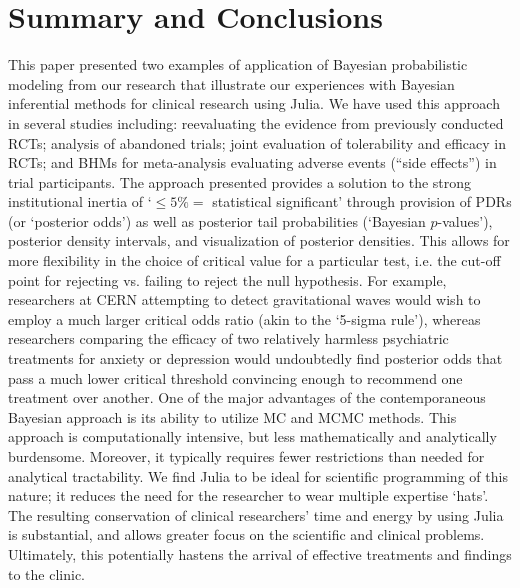 \documentclass{juliacon}
\begin{document}
\section{Summary and Conclusions}
This paper presented two examples of application of Bayesian probabilistic modeling from our research that illustrate our experiences with Bayesian inferential methods for clinical research using Julia.  We have used this approach in several studies including: reevaluating the evidence from previously conducted RCTs; analysis of abandoned trials; joint evaluation of tolerability and efficacy in RCTs; and BHMs for meta-analysis evaluating adverse events (“side effects”) in trial participants.
\vskip 6pt
The approach presented provides a solution to the strong institutional inertia of `$\le 5\% =$ statistical significant’ through provision of PDRs (or `posterior odds') as well as posterior tail probabilities (`Bayesian $p$-values’), posterior density intervals, and visualization of posterior densities. This allows for more flexibility in the choice of critical value for a particular test, i.e. the cut-off point for rejecting vs. failing to reject the null hypothesis.  For example, researchers at CERN attempting to detect gravitational waves would wish to employ a much larger critical odds ratio (akin to the `5-sigma rule'), whereas researchers comparing the efficacy of two relatively harmless psychiatric treatments for anxiety or depression would undoubtedly find posterior odds that pass a much lower critical threshold convincing enough to recommend one treatment over another.  
\vskip 6pt
One of the major advantages of the contemporaneous Bayesian approach is 
its ability to utilize MC and MCMC methods. This approach is computationally intensive, but less mathematically and analytically burdensome. Moreover, it typically requires fewer restrictions than needed for analytical tractability.  We find Julia to be ideal for scientific programming of this nature; it reduces the need for the researcher to wear multiple expertise `hats'. The resulting conservation of clinical researchers' time and energy by using Julia is substantial, and allows greater focus on the scientific and clinical problems. Ultimately, this potentially hastens the arrival of effective treatments and findings to the clinic.




%
\end{document}
